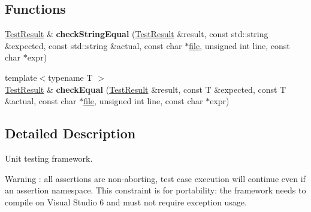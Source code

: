 \subsection*{Functions}
\begin{DoxyCompactItemize}
\item 
\hypertarget{namespace_json_test_abcf7faa375252cf8966801204bd1cc8e}{\hyperlink{class_json_test_1_1_test_result}{Test\+Result} \& {\bfseries check\+String\+Equal} (\hyperlink{class_json_test_1_1_test_result}{Test\+Result} \&result, const std\+::string \&expected, const std\+::string \&actual, const char $\ast$\hyperlink{structfile}{file}, unsigned int line, const char $\ast$expr)}\label{namespace_json_test_abcf7faa375252cf8966801204bd1cc8e}

\item 
\hypertarget{namespace_json_test_a7a20c5dfd72ae74363f7b76f11ce3d22}{{\footnotesize template$<$typename T $>$ }\\\hyperlink{class_json_test_1_1_test_result}{Test\+Result} \& {\bfseries check\+Equal} (\hyperlink{class_json_test_1_1_test_result}{Test\+Result} \&result, const T \&expected, const T \&actual, const char $\ast$\hyperlink{structfile}{file}, unsigned int line, const char $\ast$expr)}\label{namespace_json_test_a7a20c5dfd72ae74363f7b76f11ce3d22}

\end{DoxyCompactItemize}


\subsection{Detailed Description}
Unit testing framework. 

\begin{DoxyWarning}{Warning}
\+: all assertions are non-\/aborting, test case execution will continue even if an assertion namespace. This constraint is for portability\+: the framework needs to compile on Visual Studio 6 and must not require exception usage. 
\end{DoxyWarning}
